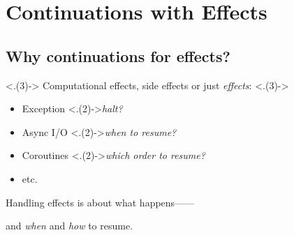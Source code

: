 \section{Continuations with Effects}
\TableOfContents{}

\subsection{Why continuations for effects?}
\begin{frame}
	\frametitlesubs{}

	{
		\only<.(3)->{\smaller[2]}
		Computational effects, side effects or just \textit{effects}:
		\only<.(3)->{\vspace{-.6\zh}}

		\begin{minipage}[t]{.8\textwidth}
			\begin{itemize}
				\only<.(3)->{\setlength{\itemsep}{-.2\zh}}
				\item Exception {\only<.(2)->{\dotfill \textit{halt?}}}
				\item Async I/O {\only<.(2)->{\dotfill \textit{when to resume?}}}
				\item Coroutines {\only<.(2)->{\dotfill \textit{which order to resume?}}}
				\item etc.
			\end{itemize}
		\end{minipage}
	}

	\vspace{.6\zh}
	Handling effects is about what happens------
	\pause
	\\\centerline{\larger{}and \textit{when} and \textit{how} to \textcolor{subhighlight}{resume}.}

	\pause

	\vspace{-.4\zh}
	\centering
	\hspace*{\fill}
	\begin{minipage}[t]{.41\textwidth}
		\vspace{.6\zh}


\end{minipage}
\end{frame}
